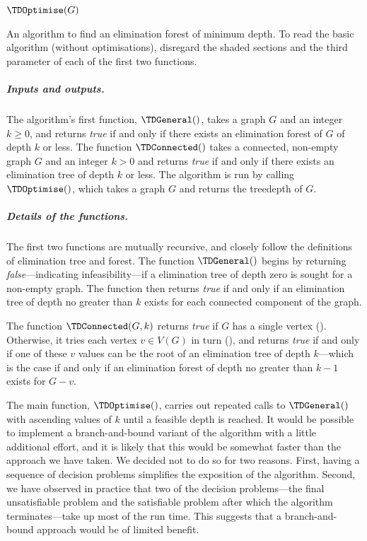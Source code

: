 {{\begin{algorithm}[h!]
    \nl $\TDOptimise(G)$ \label{td_optimise_fun} \;
    \nl {}
    \nl {}
    \nl {}
    \caption{An algorithm to find an elimination forest of minimum depth.  To read the basic algorithm
    (without optimisations), disregard the shaded sections and the third parameter
    of each of the first two functions.}
    \label{TheAlgorithm}
    \end{algorithm}
    }

    \subparagraph*{Inputs and outputs.}
    The algorithm's first function, $\TDGeneral()$, takes a graph $G$ and an integer $k \geq 0$, and returns
    \emph{true} if and only if there exists an elimination forest of $G$ of depth $k$ or less.  The function
    $\TDConnected()$ takes a connected, non-empty graph $G$ and an integer $k > 0$ and returns \emph{true}
    if and only if there exists an elimination tree of depth $k$ or less.
    The algorithm is run by calling $\TDOptimise()$, which takes a graph $G$ and returns the treedepth of $G$.

    \subparagraph*{Details of the functions.}
    The first two functions are mutually recursive, and closely follow
    the definitions of elimination tree and forest.
    The function $\TDGeneral()$ begins by returning \emph{false}---indicating
    infeasibility---if a elimination tree of depth zero is sought for a non-empty graph.
    The function then returns \emph{true} if and only if an elimination tree of depth no greater
    than $k$ exists for each connected component of the graph.

    The function $\TDConnected(G, k)$ returns \emph{true} if $G$ has a single vertex
    ().  Otherwise,
    it tries each vertex $v \in V(G)$ in turn (), and returns \emph{true} if
    and only if one of these $v$ values can be the root of an elimination tree of depth
    $k$---which is the case if and only if 
    an elimination forest of depth no greater than $k-1$ exists for $G-v$.

    The main function, $\TDOptimise()$, carries  
    out repeated calls to $\TDGeneral()$ with ascending values of $k$
    until a feasible depth is reached.  It would be possible to implement a
    branch-and-bound variant of the algorithm with a little additional effort, and it is likely that
    this would be somewhat faster than the approach we have taken.  We decided not to do so for two
    reasons.  First, having a sequence of decision problems simplifies the exposition of the algorithm.
    Second, we have observed in practice that two of the decision problems---the final unsatisfiable problem
    and the satisfiable problem after which the algorithm terminates---take up most of the run time.
    This suggests that a branch-and-bound approach would be of limited benefit.

}
